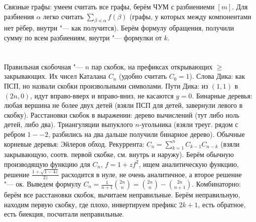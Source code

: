 Связные графы: умеем считать все графы, берём ЧУМ с разбиениеми $[m]$.
Для разбиения $\alpha$ легко считать $\sum_{\beta \preccurlyeq \alpha} f(\beta)$ (графы, у которых между компонентами
нет рёбер, внутри "--- как получится).
Берём формулу обращения, получили сумму по всем разбиениям, внутри "--- формулки от $k$.

\section{} %
Правильная скобочная "--- $n$ пар скобок, на префиксах открывающих $\ge$ закрывающих.
Их чисел Каталана $C_n$ (удобно считать $C_0=1$).
Слова Дика: как ПСП, но назвали скобки произвольными символами.
Пути Дика: из $(1,1)$ в $(2n,0)$, идут вправо-вверх и вправо-вниз, не касаются $y=0$.
Бинарные деревья: любая вершина не более двух детей (взяли ПСП для детей, завернули левого в скобку).
Расстановки скобок в выражении: дерево вычислений (тут либо ноль детей, либо два).
Триангуляции выпуклого $n$-угольника (взяли треуг. рядом с ребром $1--2$, разбились на два дальше получили бинарное дерево).
Обычные корневые деревья: Эйлеров обход.
Рекуррента: $C_n = \sum_{k=1}^n C_{k-1}C_{n-k}$ (взяли закрывающую, соотв. первой скобке, см. внутрь и наружу).
Берём обычную производящую функцию для $C_n$, $f=1+zf^2$, ищем аналитическую функцию, решение $\frac{1+\sqrt{1-4z}}{2z}$ расходится в нуле,
не очень аналитичное, а второе решение "--- ок.
Выведем формулу $C_n=\frac{1}{n+1}\binom{2n}{n}=\binom{2n}{n}-\binom{2n}{n+1}$.
Комбинаторно: берём все расстановки скобок, вычитаем неправильные.
Берём неправильную, находим первую скобку, где плохо, инвертируем префикс $2k+1$,
есть обратное, есть биекция, посчитали неправильные.

\section{} %
\TODO
